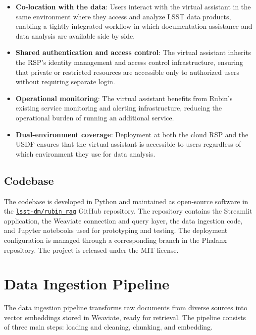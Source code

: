 \begin{itemize}
\item\textbf{Co-location with the data}: Users interact with the virtual assistant in the same environment where they access and analyze \gls{LSST} data products, enabling a tightly integrated workflow in which documentation assistance and data analysis are available side by side.
\item\textbf{Shared authentication and access control}: The virtual assistant inherits the RSP's identity management and access control infrastructure, ensuring that private or restricted resources are accessible only to authorized users without requiring separate login.
\item\textbf{Operational monitoring}: The virtual assistant benefits from Rubin's existing service monitoring and alerting infrastructure, reducing the operational burden of running an additional service.
\item\textbf{Dual-environment coverage}: Deployment at both the cloud RSP and the \gls{USDF} ensures that the virtual assistant is accessible to users regardless of which environment they use for data analysis.
\end{itemize}

\subsection{Codebase}
\label{sec:codebase}
 
The codebase is developed in Python and maintained as open-source software in the \href{https://github.com/lsst-dm/rubin_rag}{\texttt{lsst-dm/rubin\_rag}} GitHub repository.
The repository contains the Streamlit application, the Weaviate connection and query layer, the data ingestion code, and Jupyter notebooks used for prototyping and testing.
The deployment configuration is managed through a corresponding branch in the Phalanx repository.
The project is released under the MIT license.

\section{Data Ingestion Pipeline}
\label{sec:ingestion}

The data ingestion pipeline transforms raw documents from diverse sources into vector embeddings stored in Weaviate, ready for retrieval.
The pipeline consists of three main steps: loading and cleaning, chunking, and embedding.

